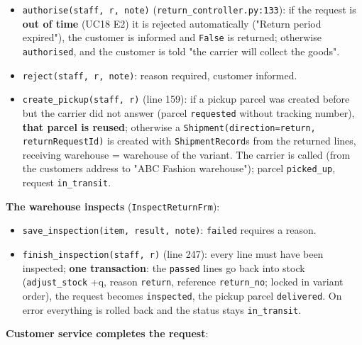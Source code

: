 \begin{itemize}
\tightlist
\item
  \texttt{authorise(\allowbreak{}staff,\allowbreak{} r,\allowbreak{} note)}
  (\texttt{return\_\allowbreak{}controller.\allowbreak{}py:133}): if the request is \textbf{out of
  time} (UC18 E2) it is rejected automatically ("Return period
  expired"), the customer is informed and \texttt{False} is returned;
  otherwise \texttt{authorised}, and the customer is told "the carrier
  will collect the goods".
\item
  \texttt{reject(\allowbreak{}staff,\allowbreak{} r,\allowbreak{} note)}: reason required, customer informed.
\item
  \texttt{create\_\allowbreak{}pickup(\allowbreak{}staff,\allowbreak{} r)} (line 159): if a pickup parcel was
  created before but the carrier did not answer (parcel
  \texttt{requested} without tracking number), \textbf{that parcel is
  reused}; otherwise a
  \texttt{Shipment(\allowbreak{}direction=\allowbreak{}return,\allowbreak{} returnRequestId)} is created with
  \texttt{ShipmentRecord}s from the returned lines, receiving warehouse
  = warehouse of the variant. The carrier is called (from the
  customer\textquotesingle s address to "ABC Fashion warehouse"); parcel
  \texttt{picked\_\allowbreak{}up}, request \texttt{in\_\allowbreak{}transit}.
\end{itemize}

\textbf{The warehouse inspects} (\texttt{InspectReturnFrm}):

\begin{itemize}
\tightlist
\item
  \texttt{save\_\allowbreak{}inspection(\allowbreak{}item,\allowbreak{} result,\allowbreak{} note)}: \texttt{failed}
  requires a reason.
\item
  \texttt{finish\_\allowbreak{}inspection(\allowbreak{}staff,\allowbreak{} r)} (line 247): every line must
  have been inspected; \textbf{one transaction}: the \texttt{passed}
  lines go back into stock (\texttt{adjust\_\allowbreak{}stock} +q, reason
  \texttt{return}, reference \texttt{return\_\allowbreak{}no}; locked in variant
  order), the request becomes \texttt{inspected}, the pickup parcel
  \texttt{delivered}. On error everything is rolled back and the status
  stays \texttt{in\_\allowbreak{}transit}.
\end{itemize}

\textbf{Customer service completes the request}:

